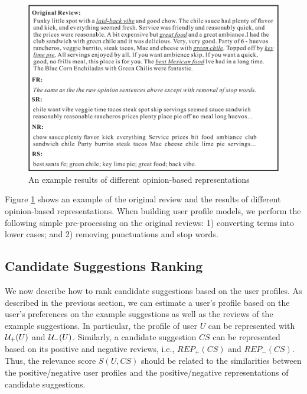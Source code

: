 \begin{figure}[t]
\centering
    \includegraphics[width=1.0\textwidth]{figures/opinosis_example.eps}
    \caption{An example results of different opinion-based  
     representations}
    \label{fig:opinosis_example}
\end{figure}


Figure \ref{fig:opinosis_example} shows an example of the 
original review and the results of different opinion-based
representations. 
When building user profile models, 
we perform the following simple pre-processing on the original reviews: 
1) converting terms into lower cases; and 
2) removing punctuations and stop words. 


\subsection{Candidate Suggestions Ranking}  
\label{sec:rank} 

We now describe how to rank candidate suggestions 
based on the user profiles.  As described in the
previous section, we can estimate a user's 
profile based on the user's preferences on the 
example suggestions as well as the reviews of 
the example suggestions. In particular, the 
profile of user $U$ can be represented with 
${\cal U}_{+}(U)$ and ${\cal U}_{-}(U)$. 
Similarly, a candidate suggestion $CS$ can be 
represented based on its positive and 
negative reviews, i.e., 
$REP_{+}(CS)$ and $REP_{-}(CS)$. 
Thus, the relevance score $S(U,CS)$ should 
be related to the similarities between the 
positive/negative user profiles and the 
positive/negative representations of candidate
suggestions.


